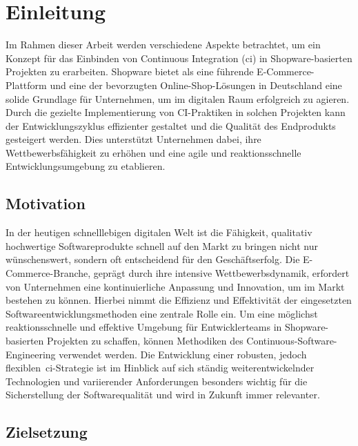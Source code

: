 
\section{Einleitung} \label{sec:01-introduction}

Im Rahmen dieser Arbeit werden verschiedene Aspekte betrachtet, um ein Konzept für das Einbinden von
Continuous Integration (\acrshort{ci}) in Shopware-basierten Projekten zu erarbeiten.
Shopware bietet als eine führende E-Commerce-Plattform und eine der bevorzugten Online-Shop-Lösungen in
Deutschland eine solide Grundlage für Unternehmen, um im digitalen Raum
erfolgreich zu agieren.
Durch die gezielte Implementierung von CI-Praktiken in solchen Projekten kann der Entwicklungszyklus effizienter
gestaltet und die Qualität des Endprodukts gesteigert werden.
Dies unterstützt Unternehmen dabei, ihre Wettbewerbsfähigkeit zu erhöhen und eine agile und reaktionsschnelle
Entwicklungsumgebung zu etablieren.

\subsection{Motivation} \label{subsec:01-introduction-1}

In der heutigen schnelllebigen digitalen Welt ist die Fähigkeit, qualitativ hochwertige Softwareprodukte schnell auf den
Markt zu bringen nicht nur wünschenswert, sondern oft entscheidend für den Geschäftserfolg.
Die E-Commerce-Branche, geprägt durch ihre intensive Wettbewerbsdynamik, erfordert von Unternehmen eine kontinuierliche
Anpassung und Innovation, um im Markt bestehen zu können.
Hierbei nimmt die Effizienz und Effektivität der eingesetzten Softwareentwicklungsmethoden eine zentrale Rolle ein.
Um eine möglichst reaktionsschnelle und effektive Umgebung für Entwicklerteams in Shopware-basierten Projekten zu
schaffen, können Methodiken des Continuous-Software-Engineering verwendet werden.
Die Entwicklung einer robusten, jedoch flexiblen\ \acrshort{ci}-Strategie ist im Hinblick auf sich ständig
weiterentwickelnder Technologien und variierender Anforderungen besonders wichtig für die Sicherstellung der
Softwarequalität und wird in Zukunft immer relevanter.

\subsection{Zielsetzung} \label{subsec:01-introduction-2}

